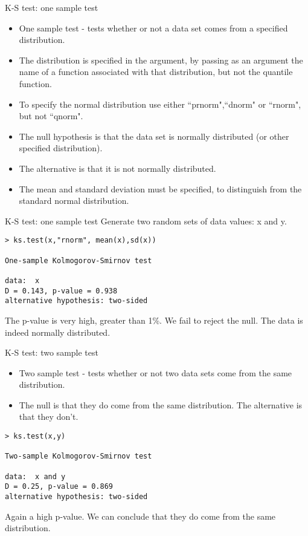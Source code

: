 \documentclass[a4paper,12pt]{article}
\begin{document}
{K-S test: one sample test}

\begin{itemize}
	\item One sample test - tests whether or not a data set comes from a specified distribution.
	\item The distribution is specified in the argument, by passing as an argument the name of a function associated with that distribution, but not the quantile function.
	\item To specify the normal distribution use either ``prnorm",``dnorm" or ``rnorm", but not ``qnorm".
	\item The null hypothesis is that the data set is normally distributed (or other specified distribution).
	\item The alternative is that it is not normally distributed.
	\item The mean and standard deviation must be specified, to distinguish from the standard normal distribution.
	
\end{itemize}

{K-S test: one sample test}
Generate two random sets of data values: x and y.
\begin{verbatim}
> ks.test(x,"rnorm", mean(x),sd(x))

One-sample Kolmogorov-Smirnov test

data:  x
D = 0.143, p-value = 0.938
alternative hypothesis: two-sided

\end{verbatim}

The p-value is very high, greater than 1\%. We fail to reject the null. The data is indeed normally distributed.


{K-S test: two sample test}

\begin{itemize}
	\item Two sample test - tests whether or not two data sets come from the same distribution.
	\item The null is that they do come from the same distribution. The alternative is that they don't.
\end{itemize}

\begin{verbatim}
> ks.test(x,y)

Two-sample Kolmogorov-Smirnov test

data:  x and y
D = 0.25, p-value = 0.869
alternative hypothesis: two-sided
\end{verbatim}
Again a high p-value. We can conclude that they do come from the same distribution.
\end{document}
